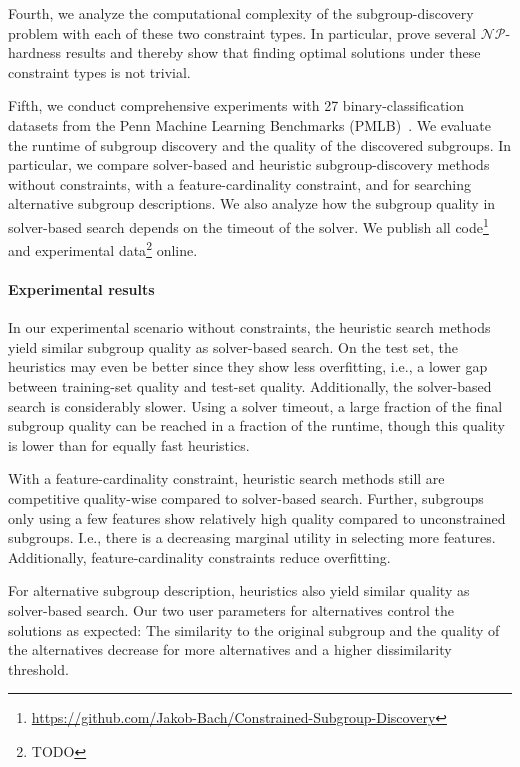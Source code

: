 \documentclass{article}
\theoremstyle{definition}
\begin{document}
Fourth, we analyze the computational complexity of the subgroup-discovery problem with each of these two constraint types.
In particular, prove several $\mathcal{NP}$-hardness results and thereby show that finding optimal solutions under these constraint types is not trivial.

Fifth, we conduct comprehensive experiments with 27 binary-classification datasets from the Penn Machine Learning Benchmarks (PMLB)~\cite{olson2017pmlb, romano2021pmlb}.
We evaluate the runtime of subgroup discovery and the quality of the discovered subgroups.
In particular, we compare solver-based and heuristic subgroup-discovery methods without constraints, with a feature-cardinality constraint, and for searching alternative subgroup descriptions.
We also analyze how the subgroup quality in solver-based search depends on the timeout of the solver.
We publish all code\footnote{\url{https://github.com/Jakob-Bach/Constrained-Subgroup-Discovery}} and experimental data\footnote{TODO} online.

\paragraph{Experimental results}

In our experimental scenario without constraints, the heuristic search methods yield similar subgroup quality as solver-based search.
On the test set, the heuristics may even be better since they show less overfitting, i.e., a lower gap between training-set quality and test-set quality.
Additionally, the solver-based search is considerably slower.
Using a solver timeout, a large fraction of the final subgroup quality can be reached in a fraction of the runtime, though this quality is lower than for equally fast heuristics.

With a feature-cardinality constraint, heuristic search methods still are competitive quality-wise compared to solver-based search.
Further, subgroups only using a few features show relatively high quality compared to unconstrained subgroups.
I.e., there is a decreasing marginal utility in selecting more features.
Additionally, feature-cardinality constraints reduce overfitting.

For alternative subgroup description, heuristics also yield similar quality as solver-based search.
Our two user parameters for alternatives control the solutions as expected:
The similarity to the original subgroup and the quality of the alternatives decrease for more alternatives and a higher dissimilarity threshold.
\end{document}
